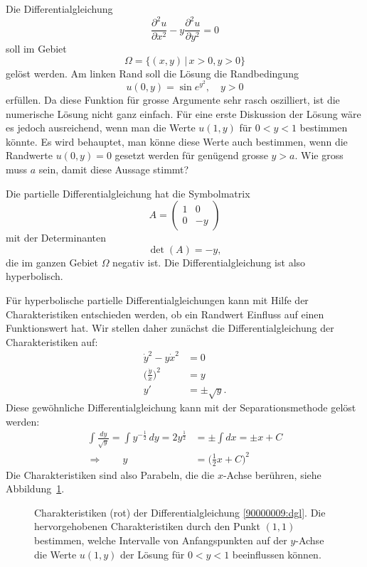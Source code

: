 Die Differentialgleichung
\begin{equation}
\frac{\partial^2 u}{\partial x^2}
-
y\frac{\partial^2 u}{\partial y^2}
=
0
\label{90000009:dgl}
\end{equation}
soll im Gebiet
\[
\Omega = \{(x,y) \,|\, x > 0, y > 0\}
\]
gelöst werden.
Am linken Rand soll die Lösung die Randbedingung
\[
u(0, y)=\sin e^{y^2},\quad y>0
\]
erfüllen.
Da diese Funktion für grosse Argumente sehr rasch oszilliert,
ist die numerische Lösung nicht ganz einfach.
Für eine erste Diskussion der Lösung wäre es jedoch ausreichend,
wenn man die Werte $u(1,y)$ für $0<y<1$ bestimmen könnte.
Es wird behauptet, man könne diese Werte auch bestimmen,
wenn die Randwerte $u(0,y)=0$
gesetzt werden für genügend grosse $y>a$. Wie gross muss $a$
sein, damit diese Aussage stimmt?

\begin{loesung}
Die partielle Differentialgleichung hat die Symbolmatrix
\[
A=\begin{pmatrix}
1&0\\
0&-y
\end{pmatrix}
\]
mit der Determinanten
\[
\det(A) = -y,
\]
die im ganzen Gebiet $\Omega$ negativ ist. Die Differentialgleichung ist
also hyperbolisch.

Für hyperbolische partielle Differentialgleichungen kann mit Hilfe der
Charakteristiken entschieden werden, ob ein Randwert Einfluss auf einen
Funktionswert hat. Wir stellen daher zunächst die Differentialgleichung
der Charakteristiken auf:
\begin{align*}
\dot y^2-y\dot x^2&=0\\
\biggl(\frac{\dot y}{\dot x}\biggr)^2&=y\\
y'&=\pm\sqrt{y}.
\end{align*}
Diese gewöhnliche Differentialgleichung kann mit der Separationsmethode
gelöst werden:
\begin{align*}
\int\frac{dy}{\sqrt{y}}
=\int y^{-\frac12}\,dy
=2y^{\frac12}
&=\pm\int dx
=\pm x+C\\
\Rightarrow\qquad
y&=\biggl(\frac12 x + C\biggr)^2
\end{align*}
Die Charakteristiken sind also Parabeln, die die $x$-Achse berühren,
siehe Abbildung~\ref{90000009:domain}.
\begin{figure}
\begin{center}
\end{center}
\caption{Charakteristiken (rot) der Differentialgleichung \eqref{90000009:dgl}.
Die hervorgehobenen Charakteristiken durch den Punkt $(1,1)$ bestimmen,
welche Intervalle von Anfangspunkten auf der $y$-Achse die Werte 
$u(1,y)$ der Lösung für $0<y<1$ beeinflussen können.
\label{90000009:domain}}
\end{figure}


\end{loesung}
